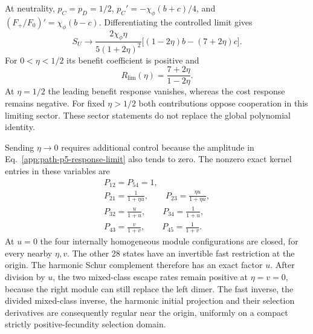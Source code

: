 \documentclass[aps,pre,reprint,amsmath,amssymb,longbibliography]{revtex4-2}
\begin{document}
At neutrality, $p_C=p_D=1/2$, $p_C'=-\chi_\phi(b+c)/4$, and
$(F_+/F_0)'=\chi_\phi(b-c)$. Differentiating the controlled limit gives
\begin{equation}
 S_U\longrightarrow
 \frac{2\chi_\phi\eta}{5(1+2\eta)^2}
 \bigl[(1-2\eta)b-(7+2\eta)c\bigr].
 \label{app:path-p5-response-limit}
\end{equation}
For $0<\eta<1/2$ its benefit coefficient is positive and
\begin{equation}
 R_{\lim}(\eta)=\frac{7+2\eta}{1-2\eta}.
 \label{app:path-p5-fixed-eta-threshold}
\end{equation}
At $\eta=1/2$ the leading benefit response vanishes, whereas the cost
response remains negative. For fixed $\eta>1/2$ both contributions
oppose cooperation in this limiting sector. These sector statements
do not replace the global polynomial identity.

Sending $\eta\to0$ requires additional control because the amplitude in
Eq.~\eqref{app:path-p5-response-limit} also tends to zero. The nonzero exact
kernel entries in these variables are
\begin{equation}
 \begin{gathered}
 P_{12}=P_{54}=1,\\
 P_{21}=\frac1{1+\eta u},\qquad P_{23}=\frac{\eta u}{1+\eta u},\\
 P_{32}=\frac{u}{1+u},\qquad P_{34}=\frac1{1+u},\\
 P_{43}=\frac{v}{1+v},\qquad P_{45}=\frac1{1+v}.
 \end{gathered}
 \label{app:path-p5-regular-kernel}
\end{equation}
At $u=0$ the four internally homogeneous module configurations are
closed, for every nearby $\eta,v$. The other 28 states have an invertible
fast restriction at the origin. The harmonic Schur complement therefore
has an exact factor $u$. After division by $u$, the two mixed-class
escape rates remain positive at $\eta=v=0$, because the right module
can still replace the left dimer. The fast inverse, the divided mixed-class
inverse, the harmonic initial projection and their selection derivatives
are consequently regular near the origin, uniformly on a compact
strictly positive-fecundity selection domain.
\end{document}
